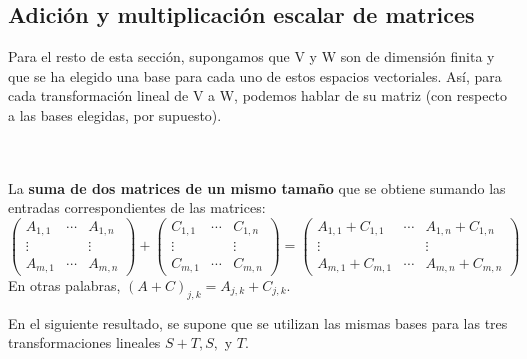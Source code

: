 \subsection*{Adición y multiplicación escalar de matrices}

Para el resto de esta sección, supongamos que V y W son de dimensión finita y que se ha elegido una base para cada uno de estos espacios vectoriales. Así, para cada transformación lineal de V a W, podemos hablar de su matriz (con respecto a las bases elegidas, por supuesto).

\setcounter{mydef}{34}
\begin{mydef}\;\\\\
    La \textbf{suma de dos matrices de un mismo tamaño} que se obtiene sumando las entradas correspondientes de las matrices:
    $$
    \begin{pmatrix}
	A_{1,1}&\cdots&A_{1,n}\\
	\vdots&&\vdots\\
	A_{m,1}&\cdots&A_{m,n}
    \end{pmatrix}
    +
    \begin{pmatrix}
	C_{1,1}&\cdots&C_{1,n}\\
	\vdots&&\vdots\\
	C_{m,1}&\cdots&C_{m,n}
    \end{pmatrix}
    =
    \begin{pmatrix}
	A_{1,1}+C_{1,1}&\cdots&A_{1,n}+C_{1,n}\\
	\vdots&&\vdots\\
	A_{m,1}+C_{m,1}&\cdots&A_{m,n}+C_{m,n}
    \end{pmatrix}
    $$
    En otras palabras, $(A+C)_{j,k}=A_{j,k}+C_{j,k}$.
\end{mydef}

En el siguiente resultado, se supone que se utilizan las mismas bases para las tres transformaciones lineales $S + T, S ,$ y $T$.

